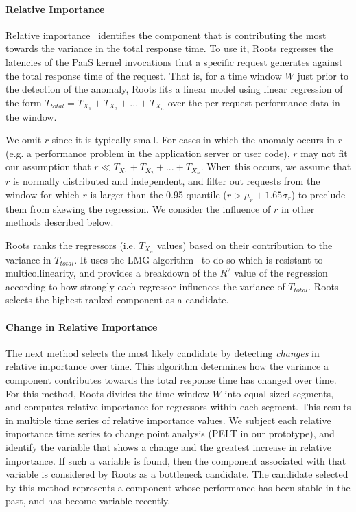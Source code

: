 \paragraph*{Relative Importance}
Relative importance~\cite{JSSv017i01} identifies the component that is contributing 
the most towards the variance in the total response time. 
To use it, Roots regresses the latencies of the PaaS kernel invocations
that a specific request generates against the total 
response time of the request.
That is, for a time window $W$ just prior to the detection of the anomaly, Roots
fits a linear model using linear regression of the form
$T_{total} = T_{X_1} + T_{X_2} + ... + T_{X_n}$
over the per-request performance data in the window.

We omit $r$ since it is typically small.
For cases in which the anomaly occurs in $r$ (e.g. a performance problem in the 
application server or user code), $r$ may
not fit our assumption that $r \ll T_{X_1} + T_{X_2} + ... + T_{X_n}$.  When this
occurs, we assume that $r$ is normally distributed and independent, and filter out
requests from the window for which $r$ is larger than the 0.95 quantile ($r > \mu_r + 1.65\sigma_r$)
to preclude them from skewing the regression. 
We consider the influence of $r$ in other methods described below.

Roots ranks the regressors (i.e. $T_{X_n}$ values) based on their contribution to the variance 
in $T_{total}$.  It uses the LMG algorithm~\cite{lmg80} to do so which is resistant to multicollinearity, 
and provides a breakdown of the $R^2$ value of
the regression according to how strongly each regressor influences
the variance of $T_{total}$.
Roots selects the highest ranked component as a candidate.

\paragraph*{Change in Relative Importance}
The next method selects the most likely candidate by detecting \textit{changes} in relative importance
over time.
This algorithm determines 
how the variance a component contributes towards the total response time has
changed over time.
For this method, Roots divides the time window $W$ into equal-sized segments,
and computes relative importance for regressors within each segment. 
This results in multiple time series of relative importance values.
We subject each relative importance time series to change point analysis (PELT in our prototype), 
and identify the variable that shows a change and the greatest
increase in relative importance.
If such a variable is found, then the component
associated with that variable is considered by Roots as a bottleneck candidate.
The candidate selected by this method represents
a component whose performance has been stable in the past, and has become variable recently.

